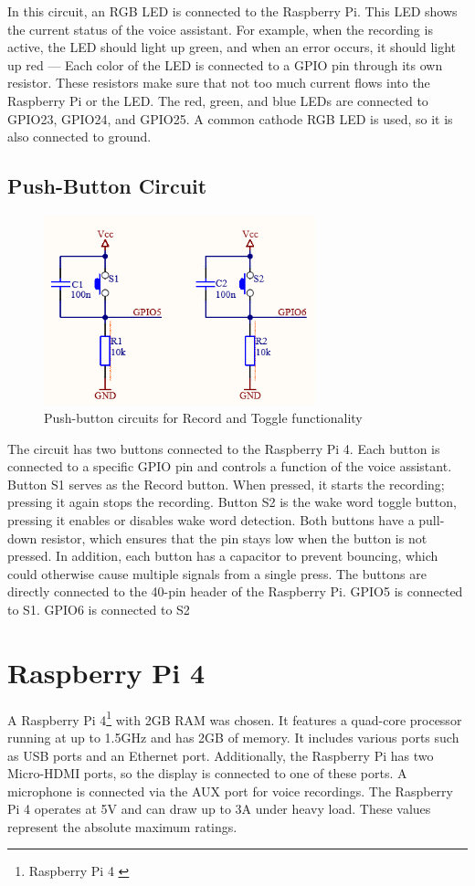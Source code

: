 In this circuit, an RGB LED is connected to the Raspberry Pi. This LED shows the current status of the voice assistant.
For example, when the recording is active, the LED should light up green, and when an error occurs, it should light up red ---
Each color of the LED is connected to a GPIO pin through its own resistor. These resistors make sure that not too much current flows into the Raspberry Pi or the LED. The red, green, and blue LEDs are connected to GPIO23, GPIO24, and GPIO25. A common cathode RGB LED is used, so it is also connected to ground.

\subsection{Push-Button Circuit}

\begin{figure}[H]
  \centering
  \includegraphics[width=0.7\textwidth]{assets/Schalter}
  \caption{Push-button circuits for Record and Toggle functionality}
\end{figure}

The circuit has two buttons connected to the Raspberry Pi 4. Each button is connected to a specific GPIO pin and controls a function of the voice assistant.
Button S1 serves as the Record button. When pressed, it starts the recording; pressing it again stops the recording.
Button S2 is the wake word toggle button, pressing it enables or disables wake word detection.
Both buttons have a pull-down resistor, which ensures that the pin stays low when the button is not pressed. In addition, each button has a capacitor to prevent bouncing, which could otherwise cause multiple signals from a single press.
The buttons are directly connected to the 40-pin header of the Raspberry Pi. GPIO5 is connected to S1. GPIO6 is connected to S2

\newpage

\section{Raspberry Pi 4}
A Raspberry Pi 4\footnote{Raspberry Pi 4 \cite{raspberry-pi}} with 2GB RAM was chosen. It features a quad-core processor running at up to 1.5GHz and has 2GB of memory. It includes various ports such as USB ports and an Ethernet port. Additionally, the Raspberry Pi has two Micro-HDMI ports, so the display is connected to one of these ports. A microphone is connected via the AUX port for voice recordings. The Raspberry Pi 4 operates at 5V and can draw up to 3A under heavy load. These values represent the absolute maximum ratings.

